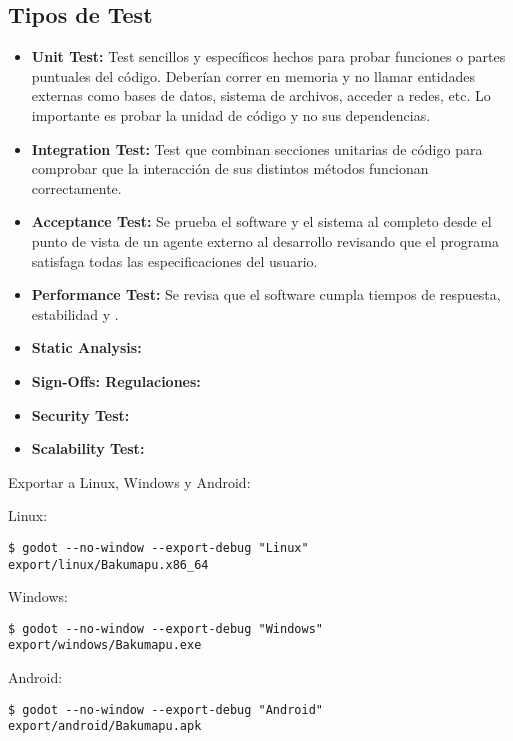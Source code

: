 
\subsection{Tipos de Test}\label{pipeline:tipos-de-test}

\begin{itemize}
  \item \textbf{Unit Test:} Test sencillos y específicos hechos para probar       funciones o partes puntuales del código. Deberían correr en memoria y no llamar entidades externas como bases de datos, sistema de archivos, acceder a redes, etc. Lo importante es probar la unidad de código y no sus dependencias. \item \textbf{Integration Test:} Test que combinan secciones unitarias de código para comprobar que la interacción de sus distintos métodos funcionan correctamente.
  \item \textbf{Acceptance Test:} Se prueba el software y el sistema al completo desde el punto de vista de un agente externo al desarrollo revisando que el programa satisfaga todas las especificaciones del usuario.
  \item \textbf{Performance Test:} Se revisa que el software cumpla tiempos de respuesta, estabilidad y .
  \item \textbf{Static Analysis:} 
  \item \textbf{Sign-Offs: Regulaciones:} 
  \item \textbf{Security Test:} 
  \item \textbf{Scalability Test:} 
\end{itemize}

Exportar a Linux, Windows y Android:

Linux:
\begin{lstlisting}
$ godot --no-window --export-debug "Linux" export/linux/Bakumapu.x86_64
\end{lstlisting}

Windows:
\begin{lstlisting}
$ godot --no-window --export-debug "Windows" export/windows/Bakumapu.exe
\end{lstlisting}

Android:
\begin{lstlisting}
$ godot --no-window --export-debug "Android" export/android/Bakumapu.apk
\end{lstlisting}
